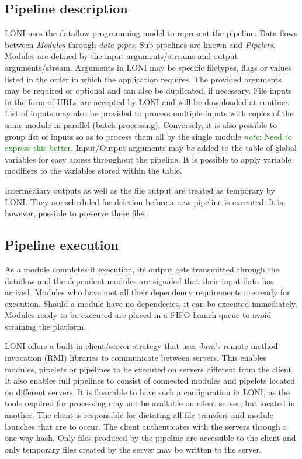 \documentclass{report}
\newcommand{\note}[1]{\textcolor{green}{\textit{note}: #1}}
\begin{document}
        \subsection{Pipeline description}
        LONI uses the dataflow programming model to represent the pipeline. Data
flows between \textit{Modules} through \textit{data pipes}. Sub-pipelines are
known and \textit{Pipelets}. Modules are defined by the input arguments/streams
and output arguments/stream. Arguments in LONI may be specific
filetypes, flags or values listed in the order in which the application
requires. The provided arguments may be required or optional and can also be
duplicated, if necessary. File inputs in the form of URLs are accepted by LONI
and will be downloaded at runtime. List of inputs may also be provided to process
multiple inputs with copies of the same module in parallel (batch processing). Conversely, it is
also possible to group list of inputs so as to process them all by the single
module \note{Need to express this better}. Input/Output arguments may be added
to the table of global variables for easy access throughout the pipeline. It is
possible to apply variable modifiers to the variables stored within the table.

Intermediary outputs as well as the file output are treated as temporary by
LONI. They are scheduled for deletion before a new pipeline is executed. It is,
however, possible to preserve these files. 
  
        \subsection{Pipeline execution}
        As a
module completes it execution, its output gets transmitted through the dataflow
and the dependent modules are signaled that their input data has arrived.
Modules who have met all their dependency requirements are ready for execution.
Should a module have no dependecies, it can be executed immediately. Modules
ready to be executed are placed in a FIFO launch queue to avoid straining the
platform. 

       LONI offers a built in client/server strategy that uses Java's remote
method invocation (RMI) libraries to communicate between servers. This enables
modules, pipelets or pipelines to be executed on servers different from the
client. It also enables full pipelines to consist of connected modules and
pipelets located on different servers. It is favorable to have such a
configuration in LONI, as the tools required for processing may not be available
on client server, but located in another. The client is responsible for
dictating all file transfers and module launches that are to occur. The client
authenticates with the servers through a one-way hash. Only files produced by
the pipeline are accessible to the client and only temporary files created by
the server may be written to the server.
\end{document}
